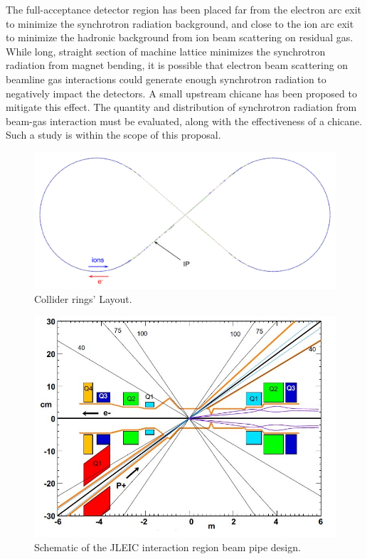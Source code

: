 The full-acceptance detector region has been placed far from the electron arc exit to minimize the synchrotron radiation background, and close to the ion arc exit to minimize the hadronic background from ion beam scattering on residual gas.  While long, straight section of machine lattice minimizes the synchrotron radiation from magnet bending, it is possible that electron beam scattering on beamline gas interactions could generate enough synchrotron radiation to negatively impact the detectors.  A small upstream chicane has been proposed to mitigate this effect.  The quantity and distribution of synchrotron radiation from beam-gas interaction must be evaluated, along with the effectiveness of a chicane.  Such a study is within the scope of this proposal.  
\begin{figure}
	\centering
	\includegraphics[width=.75\textwidth]{../../img/collider_rings_layout.jpg}
	\caption{Collider rings' Layout.}
	\label{fig:jleic2}
\end{figure}
\begin{figure}[h!]
	\centering
	\includegraphics[width=.75\textwidth]{../../img/new_beam_pipe.jpg}
	\caption{Schematic of the JLEIC interaction region beam pipe design.}
	\label{fig:jleic3}
\end{figure}

